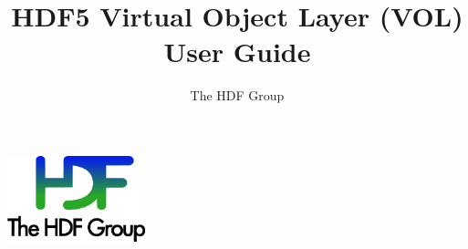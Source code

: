 \documentclass[10pt,a4paper]{article}
\begin{document}
\title{HDF5 Virtual Object Layer (VOL)\\
    User Guide}

\author{The HDF Group}

\maketitle
\thispagestyle{empty}

\vfill
\begin{center}
\includegraphics[width=4cm]{THG_LOGO.pdf} %
\end{center}
\vfill
\vfill


\newpage
{}
\tableofcontents
\newpage







\end{document}
